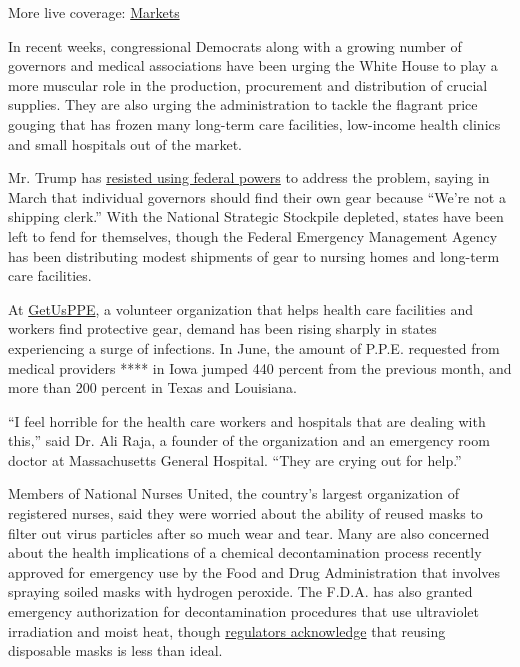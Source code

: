 More live coverage:
\href{https://www.nytimes3xbfgragh.onion/live/2020/09/09/business/stock-market-today-coronavirus?action=click\&pgtype=Article\&state=default\&region=MAIN_CONTENT_1\&context=storylines_live_updates}{Markets}

In recent weeks, congressional Democrats along with a growing number of
governors and medical associations have been urging the White House to
play a more muscular role in the production, procurement and
distribution of crucial supplies. They are also urging the
administration to tackle the flagrant price gouging that has frozen many
long-term care facilities, low-income health clinics and small hospitals
out of the market.

Mr. Trump has
\href{https://www.nytimes3xbfgragh.onion/2020/03/20/us/politics/trump-coronavirus-supplies.html}{resisted
using federal powers} to address the problem, saying in March that
individual governors should find their own gear because ``We're not a
shipping clerk.'' With the National Strategic Stockpile depleted, states
have been left to fend for themselves, though the Federal Emergency
Management Agency has been distributing modest shipments of gear to
nursing homes and long-term care facilities.

At \href{https://getusppe.org/}{GetUsPPE}, a volunteer organization that
helps health care facilities and workers find protective gear, demand
has been rising sharply in states experiencing a surge of infections. In
June, the amount of P.P.E. requested from medical providers **** in Iowa
jumped 440 percent from the previous month, and more than 200 percent in
Texas and Louisiana.

``I feel horrible for the health care workers and hospitals that are
dealing with this,'' said Dr. Ali Raja, a founder of the organization
and an emergency room doctor at Massachusetts General Hospital. ``They
are crying out for help.''

Members of National Nurses United, the country's largest organization of
registered nurses, said they were worried about the ability of reused
masks to filter out virus particles after so much wear and tear. Many
are also concerned about the health implications of a chemical
decontamination process recently approved for emergency use by the Food
and Drug Administration that involves spraying soiled masks with
hydrogen peroxide. The F.D.A. has also granted emergency authorization
for decontamination procedures that use ultraviolet irradiation and
moist heat, though
\href{https://www.cdc.gov/coronavirus/2019-ncov/hcp/ppe-strategy/decontamination-reuse-respirators.html}{regulators
acknowledge} that reusing disposable masks is less than ideal.

